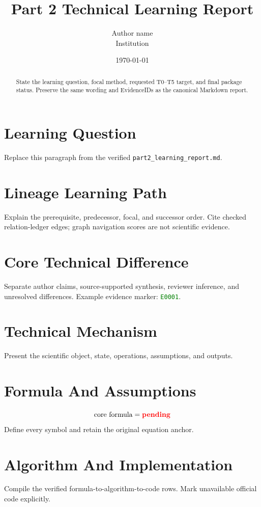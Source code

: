 \documentclass[11pt]{article}
\title{Part 2 Technical Learning Report}
\author{Author name\\Institution}
\date{\today}
\newcommand{\evidence}[1]{\textcolor{green}{\texttt{#1}}}
\newcommand{\pending}{\textcolor{red}{\textbf{pending}}}
\begin{document}
\maketitle

\begin{abstract}
State the learning question, focal method, requested T0--T5 target,
and final package status. Preserve the same wording and EvidenceIDs as the
canonical Markdown report.
\end{abstract}

\section{Learning Question}
Replace this paragraph from the verified \texttt{part2\_learning\_report.md}.

\section{Lineage Learning Path}
Explain the prerequisite, predecessor, focal, and successor order. Cite checked
relation-ledger edges; graph navigation scores are not scientific evidence.

\section{Core Technical Difference}
Separate author claims, source-supported synthesis, reviewer inference, and
unresolved differences. Example evidence marker: \evidence{E0001}.

\section{Technical Mechanism}
Present the scientific object, state, operations, assumptions, and outputs.

\section{Formula And Assumptions}
\begin{equation}
  \text{core formula} = \pending
\end{equation}
Define every symbol and retain the original equation anchor.

\section{Algorithm And Implementation}
Compile the verified formula-to-algorithm-to-code rows. Mark unavailable
official code explicitly.
\end{document}
